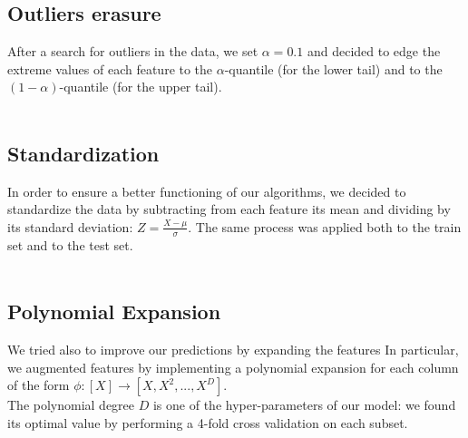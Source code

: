 \documentclass[10pt,conference,compsocconf]{IEEEtran}
\begin{document}
\subsection{Outliers erasure}
After a search for outliers in the data, we set $\alpha = 0.1$ and decided to edge the extreme values of each feature to the $\alpha$-quantile (for the lower tail) and to the $(1-\alpha)$-quantile (for the upper tail).\\
\vspace{-0.7cm}\\


\subsection{Standardization}
In order to ensure a better functioning of our algorithms, we decided to standardize the data by subtracting from each feature its mean and dividing by its standard deviation: $Z=\frac{X-\mu}{\sigma}$. The same process was applied both to the train set and to the test set.\\
\vspace{-0.7cm}\\

\subsection{Polynomial Expansion}
We tried also to improve our predictions by expanding the features In particular, we augmented features by implementing a polynomial expansion for each column of the form $\phi:[X]\rightarrow [X,X^2,...,X^D]$.\\
The polynomial degree $D$ is one of the hyper-parameters of our model: we found its optimal value by performing a 4-fold cross validation on each subset.
\end{document}
